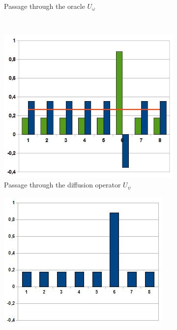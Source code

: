 \begin{figure}[ht!]
\begin{subfigure}[b]{0.40\textwidth}
            \caption{\footnotesize Passage through the oracle $U_{\omega}$}
            \label{fig2:second}
        \end{subfigure}
        \\
        \begin{subfigure}[b]{0.40\textwidth}
            \includegraphics[width=\textwidth]{Grover-MiroirMoyenne.jpg}
            \caption{\footnotesize Passage through the diffusion operator $U_{\psi}$}\footnotemark
            \label{fig2:third}
        \end{subfigure}
        \hspace{1cm}
        \begin{subfigure}[b]{0.40\textwidth}
            \includegraphics[width=\textwidth]{Grover-Amplification.jpg}

\end{subfigure}
\end{figure}
